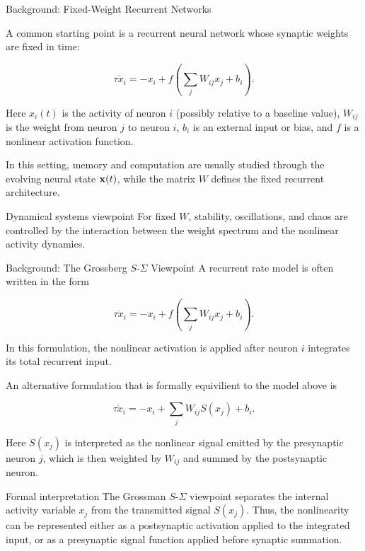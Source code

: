 \documentclass[
11pt,notheorems,hyperref={pdfauthor=whatever}
]{beamer}
\begin{document}
\begin{frame}{Background: Fixed-Weight Recurrent Networks}
\small

A common starting point is a recurrent neural network whose synaptic weights
are fixed in time:

\[
\tau \dot{x}_i
=
-x_i
+
f\left(\sum_j W_{ij}x_j+b_i\right).
\]

Here \(x_i(t)\) is the activity of neuron \(i\) (possibly relative to a baseline value), \(W_{ij}\) is the weight from
neuron \(j\) to neuron \(i\), \(b_i\) is an external input or bias, and \(f\)
is a nonlinear activation function.

\vspace{0.5em}

In this setting, memory and computation are usually studied through the
evolving neural state \({\bf x}(t)\), while the matrix \(W\) defines the fixed
recurrent architecture.

\vspace{0.5em}

\begin{block}{Dynamical systems viewpoint}
For fixed \(W\), stability, oscillations, and chaos are controlled by the
interaction between the weight spectrum and the nonlinear activity dynamics.
\end{block}

\end{frame}

\begin{frame}{Background: The Grossberg \(S\)-\(\Sigma\) Viewpoint}
A recurrent rate model is often written in the form

\[
\tau \dot{x}_i
=
-x_i
+
f\left(\sum_j W_{ij}x_j+b_i\right).
\]

In this formulation, the nonlinear activation is applied after neuron \(i\)
integrates its total recurrent input.

\vspace{0.7em}

An alternative formulation that is formally equivilient to the model above is

\[
\tau \dot{x}_i
=
-x_i
+
\sum_j W_{ij}S(x_j)
+
b_i.
\]

Here \(S(x_j)\) is interpreted as the nonlinear signal emitted by the
presynaptic neuron \(j\), which is then weighted by \(W_{ij}\) and summed by
the postsynaptic neuron.

\vspace{0.7em}

\begin{block}{Formal interpretation}
The Grossman \(S\)-\(\Sigma\) viewpoint separates the internal activity variable
\(x_j\) from the transmitted signal \(S(x_j)\). Thus, the nonlinearity can be
represented either as a postsynaptic activation applied to the integrated
input, or as a presynaptic signal function applied before synaptic summation.
\end{block}
\end{frame}
\end{document}
